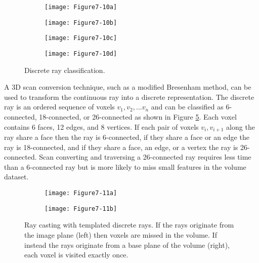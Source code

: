 \begin{figure}[!htb]
	\begin{subfigure}[h]{0.24\linewidth}
		\texttt{[image: Figure7-10a]}
		\caption*{}\label{fig:Figure7-10a}
	\end{subfigure}
	\hfill
	\begin{subfigure}[h]{0.24\linewidth}
		\texttt{[image: Figure7-10b]}
		\caption*{}\label{fig:Figure7-10b}
	\end{subfigure}%
	\hfill
	\begin{subfigure}[h]{0.24\linewidth}
		\texttt{[image: Figure7-10c]}
		\caption*{}\label{fig:Figure7-10c}
	\end{subfigure}%
	\hfill
	\begin{subfigure}[h]{0.24\linewidth}
		\texttt{[image: Figure7-10d]}
		\caption*{}\label{fig:Figure7-10d}
	\end{subfigure}%
	\caption{Discrete ray classification.}\label{fig:Figure7-10}
\end{figure}

A 3D scan conversion technique, such as a modified Bresenham method, can be used to transform the continuous ray into a discrete representation. The discrete ray is an ordered sequence of voxels $v_1, v_2,... v_n$ and can be classified as 6-connected, 18-connected, or 26-connected as shown in Figure \ref{fig:Figure7-10}. Each voxel contains 6 faces, 12 edges, and 8 vertices. If each pair of voxels  $v_i, v_{i+1}$ along the ray share a face then the ray is 6-connected, if they share a face or an edge the ray is 18-connected, and if they share a face, an edge, or a vertex the ray is 26-connected. Scan converting and traversing a 26-connected ray requires less time than a 6-connected ray but is more likely to miss small features in the volume dataset.

\begin{figure}[!htb]
	\begin{subfigure}[h]{0.48\linewidth}
		\texttt{[image: Figure7-11a]}
		\caption*{}\label{fig:Figure7-11a}
	\end{subfigure}
	\hfill
	\begin{subfigure}[h]{0.48\linewidth}
		\texttt{[image: Figure7-11b]}
		\caption*{}\label{fig:Figure7-11b}
	\end{subfigure}%
	\caption{Ray casting with templated discrete rays. If the rays originate from the image plane (left) then voxels are missed in the volume. If instead the rays originate from a base plane of the volume (right), each voxel is visited exactly once.}\label{fig:Figure7-11}
\end{figure}

